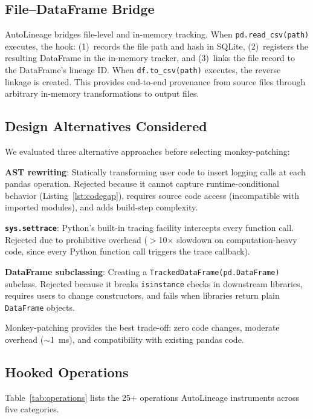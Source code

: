 \documentclass[10pt,twocolumn]{article}
\begin{document}
\subsection{File--DataFrame Bridge}

AutoLineage bridges file-level and in-memory tracking. When \texttt{pd.read\_csv(path)} executes, the hook: (1)~records the file path and hash in SQLite, (2)~registers the resulting DataFrame in the in-memory tracker, and (3)~links the file record to the DataFrame's lineage ID. When \texttt{df.to\_csv(path)} executes, the reverse linkage is created. This provides end-to-end provenance from source files through arbitrary in-memory transformations to output files.

\subsection{Design Alternatives Considered}

We evaluated three alternative approaches before selecting monkey-patching:

\textbf{AST rewriting}: Statically transforming user code to insert logging calls at each pandas operation. Rejected because it cannot capture runtime-conditional behavior (Listing~\ref{lst:codegap}), requires source code access (incompatible with imported modules), and adds build-step complexity.

\textbf{\texttt{sys.settrace}}: Python's built-in tracing facility intercepts every function call. Rejected due to prohibitive overhead ($>$10$\times$ slowdown on computation-heavy code, since every Python function call triggers the trace callback).

\textbf{DataFrame subclassing}: Creating a \texttt{TrackedDataFrame(pd.DataFrame)} subclass. Rejected because it breaks \texttt{isinstance} checks in downstream libraries, requires users to change constructors, and fails when libraries return plain \texttt{DataFrame} objects.

Monkey-patching provides the best trade-off: zero code changes, moderate overhead ($\sim$1~ms), and compatibility with existing pandas code.

\subsection{Hooked Operations}

Table~\ref{tab:operations} lists the 25+ operations AutoLineage instruments across five categories.
\end{document}
